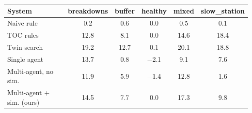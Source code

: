 \begin{tabular}{lccccc}
\toprule
System & breakdowns & buffer & healthy & mixed & slow\_station \\
\midrule
Naive rule & 0.2 & 0.6 & 0.0 & 0.5 & 0.1 \\
TOC rules & 12.8 & 8.1 & 0.0 & 14.6 & 18.4 \\
Twin search & 19.2 & 12.7 & 0.1 & 20.1 & 18.8 \\
Single agent & 13.7 & 0.8 & $-$2.1 & 9.1 & 7.6 \\
Multi-agent, no sim. & 11.9 & 5.9 & $-$1.4 & 12.8 & 1.6 \\
Multi-agent + sim. (ours) & 14.5 & 7.7 & 0.0 & 17.3 & 9.8 \\
\bottomrule
\end{tabular}
